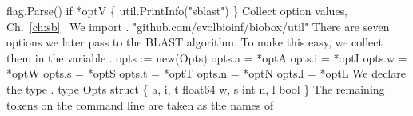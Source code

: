\nwenddocs{}\endmoddef\nwstartdeflinemarkup{}\nwenddeflinemarkup
flag.Parse()
if *optV \{
          util.PrintInfo("sblast")
\}
\LA{}Collect option values, Ch.~\ref{ch:sb}~{\nwtagstyle{}}\RA{}
\nwendcode{}\nwdocspar
We import .
\nwenddocs{}\plusendmoddef\nwstartdeflinemarkup{}\nwenddeflinemarkup
"github.com/evolbioinf/biobox/util"
\nwendcode{}\nwdocspar
There are seven options we later pass to the BLAST algorithm. To
make this easy, we collect them in the variable .
\nwenddocs{}\endmoddef\nwstartdeflinemarkup{}\nwenddeflinemarkup
opts := new(Opts)
opts.a = *optA
opts.i = *optI
opts.w = *optW
opts.s = *optS
opts.t = *optT
opts.n = *optN
opts.l = *optL
\nwendcode{}\nwdocspar
We declare the type .
\nwenddocs{}\endmoddef\nwstartdeflinemarkup{}\nwenddeflinemarkup
type Opts struct \{
          a, i, t float64
          w, s int
          n, l bool
\}
\nwendcode{}\nwdocspar
The remaining tokens on the command line are taken as the names of
